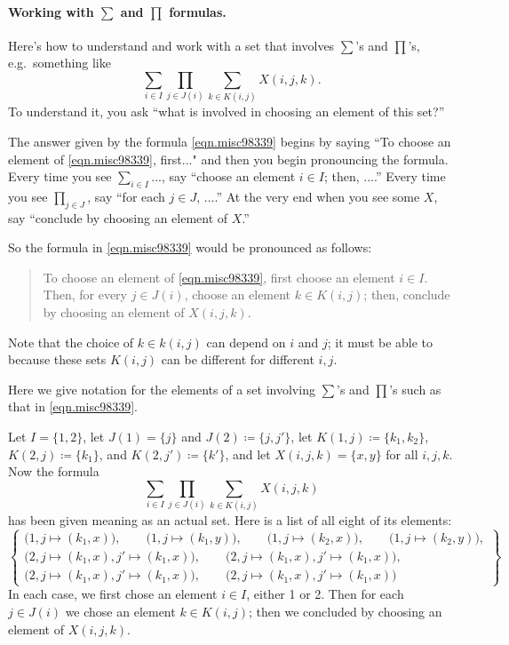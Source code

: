 \documentclass[Book-Poly]{subfiles}
\begin{document}
\paragraph{Working with $\sum$ and $\prod$ formulas.}
Here's how to understand and work with a set that involves $\sum$'s and $\prod$'s, e.g.\ something like
\begin{equation}\label{eqn.misc98339}
\sum_{i\in I}\prod_{j\in J(i)}\sum_{k\in K(i,j)}X(i,j,k).
\end{equation}
To understand it, you ask ``what is involved in choosing an element of this set?'' 

The answer given by the formula \eqref{eqn.misc98339} begins by saying ``To choose an element of \eqref{eqn.misc98339}, first..." and then you begin pronouncing the formula. Every time you see $\sum_{i\in I}...$, say ``choose an element $i\in I$; then, ....'' Every time you see $\prod_{j\in J}$, say ``for each $j\in J$, ....'' At the very end when you see some $X$, say ``conclude by choosing an element of $X$.''

So the formula in \eqref{eqn.misc98339} would be pronounced as follows:
\begin{quote}
To choose an element of \eqref{eqn.misc98339}, first choose an element $i\in I$. Then, for every $j\in J(i)$, choose an element $k\in K(i,j)$; then, conclude by choosing an element of $X(i,j,k)$.
\end{quote}
Note that the choice of $k\in k(i,j)$ can depend on $i$ and $j$; it must be able to because these sets $K(i,j)$ can be different for different $i,j$.

\begin{example}\label{ex.notation_sum_prod}
Here we give notation for the elements of a set involving $\sum$'s and $\prod$'s such as that in \eqref{eqn.misc98339}.

Let $I=\{1,2\}$, let $J(1)=\{j\}$ and $J(2)\coloneqq\{j,j'\}$, let $K(1,j)\coloneqq\{k_1,k_2\}$, $K(2,j)\coloneqq\{k_1\}$, and $K(2,j')\coloneqq\{k'\}$, and let $X(i,j,k)=\{x,y\}$ for all $i,j,k$. Now the formula 
\[\sum_{i\in I}\prod_{j\in J(i)}\sum_{k\in K(i,j)}X(i,j,k)\]
 has been given meaning as an actual set. Here is a list of all eight of its elements:
\[
\left\{
\begin{gathered}
	\big(1, j\mapsto(k_1,x)\big),\qquad
	\big(1, j\mapsto(k_1,y)\big),\qquad
	\big(1, j\mapsto(k_2,x)\big),\qquad
	\big(1, j\mapsto(k_2,y)\big),\\
	\big(2, j\mapsto(k_1,x), j'\mapsto(k_1,x)\big),\qquad
	\big(2, j\mapsto(k_1,x), j'\mapsto(k_1,x)\big),\\
	\big(2, j\mapsto(k_1,x), j'\mapsto(k_1,x)\big),\qquad
	\big(2, j\mapsto(k_1,x), j'\mapsto(k_1,x)\big)
\end{gathered}
\right\}
\]
In each case, we first chose an element $i\in I$, either 1 or 2. Then for each $j\in J(i)$ we chose an element $k\in K(i,j)$; then we concluded by choosing an element of $X(i,j,k)$.
\end{example}
\end{document}
